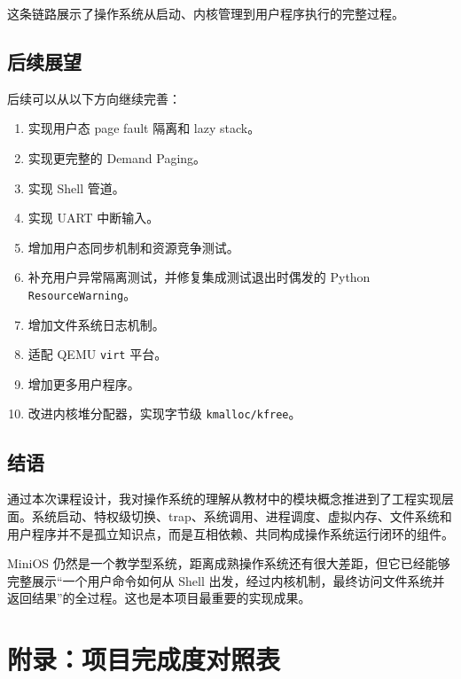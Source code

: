 \documentclass[UTF8,a4paper,12pt,openany,fontset=fandol]{ctexrep}
\begin{document}
这条链路展示了操作系统从启动、内核管理到用户程序执行的完整过程。

\section{后续展望}

后续可以从以下方向继续完善：

\begin{enumerate}
\item 实现用户态 page fault 隔离和 lazy stack。
\item 实现更完整的 Demand Paging。
\item 实现 Shell 管道。
\item 实现 UART 中断输入。
\item 增加用户态同步机制和资源竞争测试。
\item 补充用户异常隔离测试，并修复集成测试退出时偶发的 Python \nolinkurl{ResourceWarning}。
\item 增加文件系统日志机制。
\item 适配 QEMU \nolinkurl{virt} 平台。
\item 增加更多用户程序。
\item 改进内核堆分配器，实现字节级 \nolinkurl{kmalloc/kfree}。
\end{enumerate}

\section{结语}

通过本次课程设计，我对操作系统的理解从教材中的模块概念推进到了工程实现层面。系统启动、特权级切换、trap、系统调用、进程调度、虚拟内存、文件系统和用户程序并不是孤立知识点，而是互相依赖、共同构成操作系统运行闭环的组件。

MiniOS 仍然是一个教学型系统，距离成熟操作系统还有很大差距，但它已经能够完整展示“一个用户命令如何从 Shell 出发，经过内核机制，最终访问文件系统并返回结果”的全过程。这也是本项目最重要的实现成果。

\appendix
\chapter*{附录：项目完成度对照表}
\end{document}
